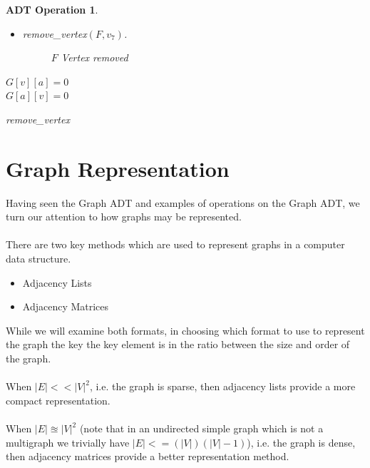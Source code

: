 \documentclass[11pt,reqno]{amsart}
\newtheorem{oper}[thm]{ADT Operation}
\theoremstyle{definition}
\numberwithin{equation}{section}
\begin{document}
\begin{oper}
\begin{itemize}
\begin{figure}[h!]
			\caption{$F$ No change}
			\label{fig:ForestV9}
			\end{figure}
		
		\item remove\_vertex$(F,v_7)$.\\
			\begin{figure}[h!]
			\caption{$F$ Vertex removed}
			\label{fig:ForestV9}
			\end{figure}
	\end{itemize}
\pagebreak
\begin{algorithm}[H]
\SetAlgoLined
{}
			{$G[v][a]=0$
			\\$G[a][v]=0$}
\caption{remove\_vertex}
\end{algorithm}
\end{oper}

\pagebreak
\section{Graph Representation}\label{repr}
\noindent Having seen the Graph ADT and examples of operations on the Graph ADT, we turn our attention to how graphs may be represented.\\
\\
There are two key methods which are used to represent graphs in a computer data structure.
\begin{itemize}
	\item Adjacency Lists
	\item Adjacency Matrices
\end{itemize}

\noindent While we will examine both formats, in choosing which format to use to represent the graph the key the key element is in the ratio between the size and order of the graph.\\
\\
When  $|E| < < |V|^2$, i.e. the graph is sparse, then adjacency lists provide a more compact representation. \\
\\
When  $|E| \approxeq |V|^2$ (note that in an undirected simple graph which is not a multigraph we trivially have $|E|<=(|V|)(|V|-1)$), i.e. the graph is dense, then adjacency matrices provide a better representation method.
\end{document}
